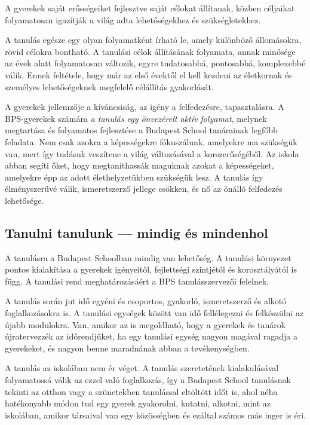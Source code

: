 A gyerekek saját erősségeiket fejlesztve saját célokat állítanak, közben
céljaikat folyamatosan igazítják a világ adta lehetőségekhez és
szükségletekhez.

A tanulás egésze egy olyan folyamatként írható le, amely különböző
állomásokra, rövid célokra bontható. A tanulási célok állításának
folyamata, annak minősége az évek alatt folyamatosan változik, egyre
tudatosabbá, pontosabbá, komplexebbé válik. Ennek feltétele, hogy már az
első évektől el kell kezdeni az életkornak és személyes
lehetőségeknek megfelelő célállítás gyakorlását.

A gyerekek jellemzője a kíváncsiság, az igény a felfedezésre,
tapasztalásra. A BPS-gyerekek számára \emph{a tanulás egy önvezérelt aktív
folyamat}, melynek megtartása és folyamatos fejlesztése a Budapest
School tanárainak legfőbb feladata. Nem csak azokra a képességekre
fókuszálunk, amelyekre ma szükségük van, mert így tudásuk veszítene a
világ változásával a korszerűségéből. Az iskola abban segíti őket, hogy
megtaníthassák maguknak azokat a képességeket, amelyekre épp az adott
élethelyzetükben szükségük lesz. A tanulás így élményszerűvé válik,
ismeretszerző jellege csökken, és nő az önálló felfedezés lehetősége.

\hypertarget{tanulni-tanulunk-mindig-es-mindenhol}{%
\subsection{Tanulni tanulunk --- mindig és
mindenhol}\label{tanulni-tanulunk-mindig-es-mindenhol}}

A tanulásra a Budapest Schoolban mindig van lehetőség. A tanulási
környezet pontos kialakítása a gyerekek igényeitől, fejlettségi
szintjétől és\break
korosztályától is függ. A tanulási rend meghatározásáért a
BPS tanulásszervezői felelnek.

A tanulás során jut idő egyéni és csoportos, gyakorló, ismeretszerző és
alkotó foglalkozásokra is. A tanulási egységek között van idő
fellélegezni és felkészülni az újabb modulokra. Van, amikor az is
megoldható, hogy a gyerekek és tanárok újratervezzék az időrendjüket, ha
egy tanulási egység nagyon magával ragadja a gyerekeket, és nagyon benne
maradnának abban a tevékenységben.

A tanulás az iskolában nem ér véget. A tanulás szeretetének
kialakulásával folyamatossá válik az ezzel való foglalkozás, így a
Budapest School tanulásnak tekinti az otthon vagy a szünetekben
tanulással eltöltött időt is, ahol néha hatékonyabb módon tud egy gyerek
gyakorolni, kutatni, alkotni, mint az iskolában, amikor társaival van
egy közösségben és ezáltal számos más inger is éri.

